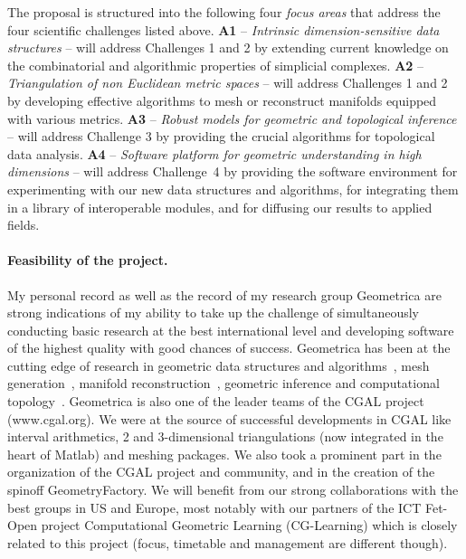 The proposal is structured into the following four {\em focus areas}  that address the four scientific challenges listed above.
{\bf A1} -- {\em Intrinsic dimension-sensitive data  structures} --  will address Challenges 1 and 2 by extending current knowledge on the combinatorial and algorithmic properties of simplicial complexes. 
  {\bf A2} --  {\em Triangulation of non Euclidean metric spaces} -- will address Challenges 1 and 2 by developing effective algorithms to mesh or reconstruct manifolds equipped with various metrics.   {\bf A3} -- {\em Robust models for geometric and topological inference} -- will address Challenge 3 by providing the crucial  algorithms for topological data analysis.
 {\bf A4} --  {\em  Software platform for geometric understanding in high dimensions} -- will address Challenge~4 by providing the software environment for experimenting with our new data structures and algorithms, for integrating them in a library of interoperable modules, and for diffusing our results to applied fields. 
\vspace{-1mm}

\paragraph{Feasibility of the project.} 


My personal record as well as the record of my research group Geometrica are strong indications of my ability to take up the challenge of simultaneously conducting basic research at the best international level and developing software of the highest quality with good chances of success.  
Geometrica has been at the cutting edge of research in geometric data structures and algorithms~\cite{by-ag-98}, mesh generation~\cite{geometrica-ecg-book}, manifold reconstruction~\cite{geometrica-7142i,geometrica-bgo-09}, geometric inference and computational topology~\cite{geometrica-ccl09,geometrica-cseh-07}. Geometrica is also one of the leader teams of the CGAL project (www.cgal.org).  We were at the source of successful developments in CGAL like interval arithmetics, 2 and 3-dimensional triangulations (now integrated in the heart of Matlab) and meshing packages. We also took a prominent part in the organization of the CGAL project and community, and in the creation of the spinoff GeometryFactory.
%
We will benefit from our strong collaborations with the best groups in US and  Europe,
most notably with our partners of the ICT Fet-Open project Computational Geometric Learning (CG-Learning) which is closely related to this project (focus, timetable and management are different though).

